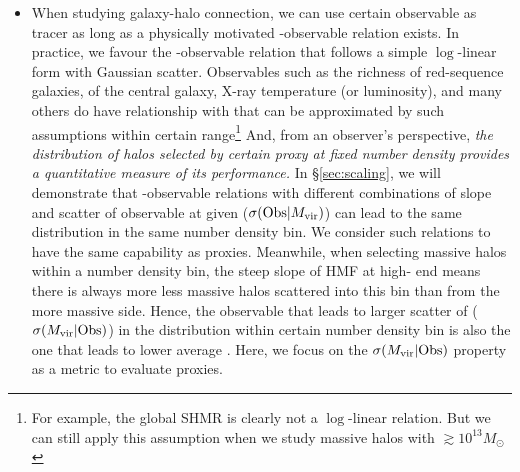 \documentclass[fleqn,usenatbib,useAMS,english]{mnras}
\begin{document}

    \begin{itemize}

        \item When studying galaxy-halo connection, we can use certain observable as \mvir{} 
            tracer as long as a physically motivated \mvir{}-observable relation exists.
            In practice, we favour the \mvir{}-observable relation that follows a simple 
            $\log$-linear form with Gaussian scatter.
            Observables such as the richness of red-sequence galaxies, \mstar{} of the central 
            galaxy, X-ray temperature (or luminosity), and many others do have relationship 
            with \mvir{} that can be approximated by such assumptions within certain \mvir{}
            range\footnote{For example, the global SHMR is clearly not a $\log$-linear 
            relation. But we can still apply this assumption when we study massive halos 
            with \mvir{}$\gtrsim 10^{13} M_{\odot}$}
            And, from an observer's perspective, \emph{the \mvir{} distribution of halos selected
            by certain \mvir{} proxy at fixed number density provides a quantitative measure of
            its performance.}
            In \S \ref{sec:scaling}, we will demonstrate that \mvir{}-observable relations with 
            different combinations of slope and scatter of observable at
            given \mvir{} ($\sigma({\rm Obs}| M_{\rm vir})$) can lead to the same \mvir{}
            distribution in the same number density bin.
            We consider such relations to have the same capability as \mvir{} proxies.
            Meanwhile, when selecting massive halos within a number density bin, the steep slope
            of HMF at high-\mvir{} end means there is always more less massive halos scattered
            into this bin than from the more massive side.
            Hence, the observable that leads to larger scatter of \mvir{} 
            ($\sigma(M_{\rm vir} | {\rm Obs})$) in the \mvir{} distribution within certain 
            number density bin is also the one that leads to lower average \mvir{}.
            Here, we focus on the $\sigma(M_{\rm vir} | {\rm Obs})$ property as a metric to 
            evaluate \mvir{} proxies.
        

\end{itemize}
\end{document}
